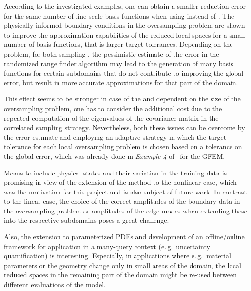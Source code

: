 \documentclass[AMA,STIX1COL,doublespace]{WileyNJD-v2}
\begin{document}
According to the investigated examples, one can obtain a smaller reduction
error for the same number of fine scale basis functions when
using 
instead of .
The physically informed boundary conditions in the oversampling problem are shown
to improve the approximation capabilities of the reduced local spaces for
a small number of basis functions, that is larger target tolerances.
Depending on the problem, for both sampling ,
the pessimistic estimate of the error
in the randomized range finder algorithm
may lead to the generation of many basis functions for certain subdomains that
do not contribute to improving the global error, but result
in more accurate approximations for that part of the domain.

This effect seems to be stronger in case of the  and dependent on the size of the oversampling problem,
one has to consider the additional cost due to the repeated computation of
the eigenvalues of the covariance matrix in the correlated sampling strategy.
Nevertheless, both these issues can be overcome by 
the error estimate  and employing an adaptive strategy in which the
target tolerance for each local oversampling problem is chosen
based on a tolerance on the global error, which was already
done in \textit{Example 4} of~\cite{BS2018} for the GFEM.

Means to include physical states and their variation in the
training data is promising in view of the extension of the method to the
nonlinear case, which was the motivation for this project and
is also subject of future work.
In contrast to the linear case, the choice of the correct amplitudes of the
boundary data in the oversampling problem or amplitudes of the edge modes
when extending these into the respective subdomains poses a great challenge.

Also, the extension to parameterized PDEs and
development of an offline/online framework for application
in a many-query context (e.\,g.\, uncertainty quantification)
is interesting.
Especially, in applications where e.\,g.\, material parameters
or the geometry change only in small areas of the domain,
the local reduced spaces in the remaining part of the domain
might be re-used between different evaluations of the model.
\end{document}
